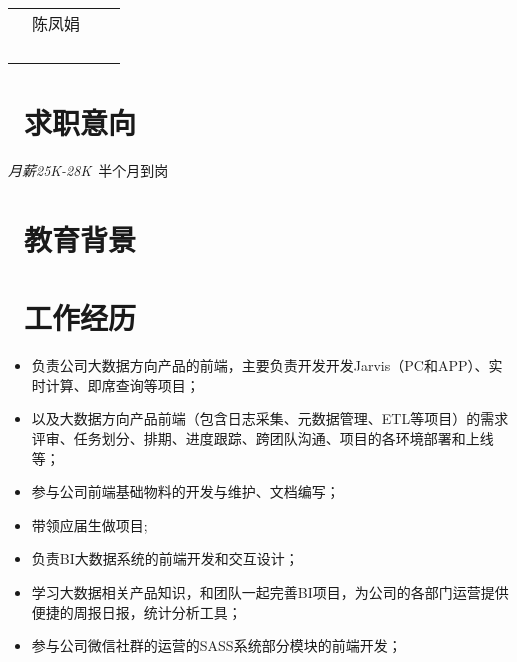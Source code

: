 \documentclass{resume}
\begin{document}

\Large{
  \begin{tabu}{ l l r r }
    & \scshape{陈凤娟} &  & \\
    &  &  \\
    &  &  \\
    &  &  \\
    &  & 
  \end{tabu}
}

\normalsize
\section{\faInfo\  求职意向}
\textit{月薪25K-28K}\ 半个月到岗

\section{\faGraduationCap\  教育背景}

\section{\faGraduationCap\  工作经历}

\begin{onehalfspacing}
\begin{itemize}
  \item 负责公司大数据方向产品的前端，主要负责开发开发Jarvis（PC和APP）、实时计算、即席查询等项目；
  \item 以及大数据方向产品前端（包含日志采集、元数据管理、ETL等项目）的需求评审、任务划分、排期、进度跟踪、跨团队沟通、项目的各环境部署和上线等；
  \item 参与公司前端基础物料的开发与维护、文档编写；
  \item 带领应届生做项目;
\end{itemize}
\end{onehalfspacing}

\begin{onehalfspacing}
\begin{itemize}
  \item 负责BI大数据系统的前端开发和交互设计；
  \item 学习大数据相关产品知识，和团队一起完善BI项目，为公司的各部门运营提供便捷的周报日报，统计分析工具；
  \item 参与公司微信社群的运营的SASS系统部分模块的前端开发；
\end{itemize}
\end{onehalfspacing}
\end{document}
